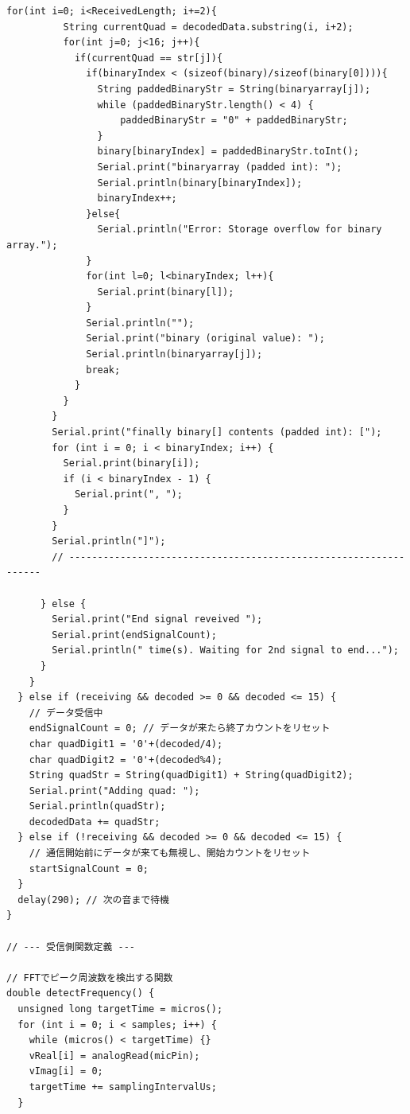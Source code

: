 \begin{lstlisting}[caption=vibration\_tx\_itg.ino]
        for(int i=0; i<ReceivedLength; i+=2){
          String currentQuad = decodedData.substring(i, i+2);
          for(int j=0; j<16; j++){
            if(currentQuad == str[j]){
              if(binaryIndex < (sizeof(binary)/sizeof(binary[0]))){
                String paddedBinaryStr = String(binaryarray[j]);
                while (paddedBinaryStr.length() < 4) {
                    paddedBinaryStr = "0" + paddedBinaryStr;
                }
                binary[binaryIndex] = paddedBinaryStr.toInt();
                Serial.print("binaryarray (padded int): ");
                Serial.println(binary[binaryIndex]);
                binaryIndex++;
              }else{
                Serial.println("Error: Storage overflow for binary array.");
              }
              for(int l=0; l<binaryIndex; l++){
                Serial.print(binary[l]);
              }
              Serial.println("");
              Serial.print("binary (original value): ");
              Serial.println(binaryarray[j]);
              break;
            }
          }
        }
        Serial.print("finally binary[] contents (padded int): [");
        for (int i = 0; i < binaryIndex; i++) {
          Serial.print(binary[i]);
          if (i < binaryIndex - 1) {
            Serial.print(", ");
          }
        }
        Serial.println("]");
        // -----------------------------------------------------------------

      } else {
        Serial.print("End signal reveived ");
        Serial.print(endSignalCount);
        Serial.println(" time(s). Waiting for 2nd signal to end...");
      }
    }
  } else if (receiving && decoded >= 0 && decoded <= 15) {
    // データ受信中
    endSignalCount = 0; // データが来たら終了カウントをリセット
    char quadDigit1 = '0'+(decoded/4);
    char quadDigit2 = '0'+(decoded%4);
    String quadStr = String(quadDigit1) + String(quadDigit2);
    Serial.print("Adding quad: ");
    Serial.println(quadStr);
    decodedData += quadStr;
  } else if (!receiving && decoded >= 0 && decoded <= 15) {
    // 通信開始前にデータが来ても無視し、開始カウントをリセット
    startSignalCount = 0;
  }
  delay(290); // 次の音まで待機
}

// --- 受信側関数定義 ---

// FFTでピーク周波数を検出する関数
double detectFrequency() {
  unsigned long targetTime = micros();
  for (int i = 0; i < samples; i++) {
    while (micros() < targetTime) {}
    vReal[i] = analogRead(micPin);
    vImag[i] = 0;
    targetTime += samplingIntervalUs;
  }


\end{lstlisting}
